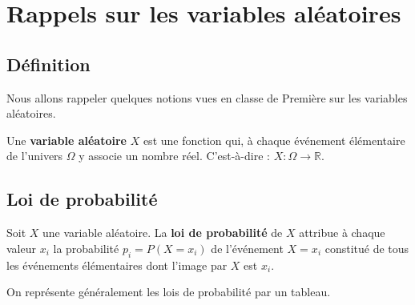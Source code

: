 






	\section{Rappels sur les variables aléatoires}

	\subsection{Définition}

	Nous allons rappeler quelques notions vues en classe de Première sur les variables aléatoires.

	\begin{formula}[Définition]
		Une \textbf{variable aléatoire} $X$ est une fonction qui, à chaque événement élémentaire de l'univers $\Omega$ y associe un nombre réel. C'est-à-dire : $X : \Omega \rightarrow \mathbb{R}$.
	\end{formula}

	\subsection{Loi de probabilité}

	\begin{formula}[Définition]
		Soit $X$ une variable aléatoire. La \textbf{loi de probabilité} de $X$ attribue à chaque valeur $x_i$ la probabilité $p_i = P(X = x_i)$ de l'événement $X = x_i$ constitué de tous les événements élémentaires dont l'image par $X$ est $x_i$.
	\end{formula}

	On représente généralement les lois de probabilité par un tableau.

